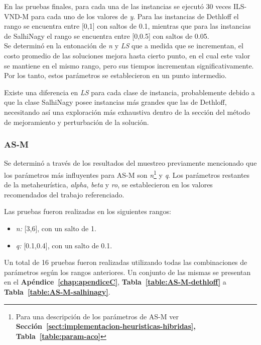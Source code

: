 En las pruebas finales, para cada una de las instancias se ejecutó 30 veces ILS-VND-M para cada uno de los valores de \textit{y}. Para las instancias de Dethloff el rango se encuentra entre [0,1] con saltos de 0.1, mientras que para las instancias de SalhiNagy el rango se encuentra entre [0,0.5] con saltos de 0.05.\\ 

Se determinó en la entonación de \emph{n} y \emph{LS} que a medida que se incrementan, el costo promedio de las soluciones mejora hasta cierto punto, en el cual este valor se mantiene en el mismo rango, pero sus tiempos incrementan significativamente. Por los tanto, estos parámetros se establecieron en un punto intermedio.

Existe una diferencia en \emph{LS} para cada clase de instancia, probablemente debido a que la clase SalhiNagy posee instancias más grandes que las de Dethloff, necesitando así una exploración más exhaustiva dentro de la sección del método de mejoramiento y perturbación de la solución.\\

\subsubsection*{AS-M}

Se determinó a través de los resultados del muestreo previamente mencionado que los parámetros más influyentes para AS-M son \emph{n}\footnote{Para una descripción de los parámetros de AS-M ver \textbf{Sección~\ref{sect:implementacion-heuristicas-hibridas}, Tabla~\ref{table:param-aco}}} y \emph{q}. Los parámetros restantes de la metaheurística, \emph{alpha}, \emph{beta} y \emph{ro}, se establecieron en los valores recomendados del  trabajo referenciado.

Las pruebas fueron realizadas en los siguientes rangos:

\begin{itemize}
\item \emph{n:} [3,6], con un salto de 1.
\item \emph{q:} [0.1,0.4], con un salto de 0.1.
\end{itemize}

Un total de 16 pruebas fueron realizadas utilizando todas las combinaciones de parámetros según los rangos anteriores. Un conjunto de las mismas se presentan en el \textbf{Apéndice~\ref{chap:apendiceC}}, 
\textbf{Tabla~\ref{table:AS-M-dethloff}} a \textbf{Tabla~\ref{table:AS-M-salhinagy}}.

